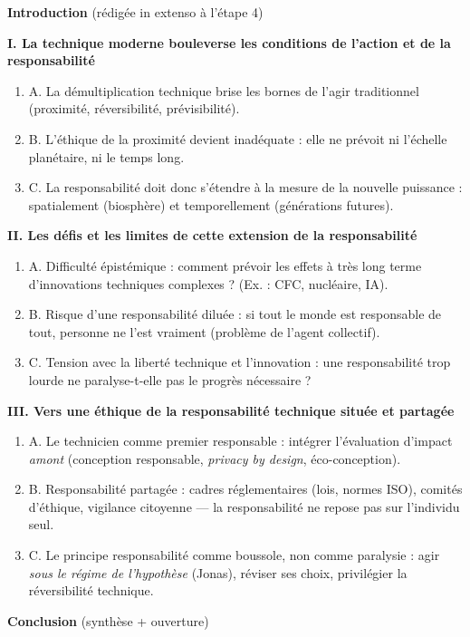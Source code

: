 \documentclass[11pt]{article}
\begin{document}
\begin{exoresolu}
\textbf{Introduction} (rédigée in extenso à l'étape 4)

\textbf{I. La technique moderne bouleverse les conditions de l'action et de la responsabilité}
\begin{enumerate}
\item A. La démultiplication technique brise les bornes de l'agir traditionnel (proximité, réversibilité, prévisibilité).
\item B. L'éthique de la proximité devient inadéquate : elle ne prévoit ni l'échelle planétaire, ni le temps long.
\item C. La responsabilité doit donc s'étendre à la mesure de la nouvelle puissance : spatialement (biosphère) et temporellement (générations futures).
\end{enumerate}

\textbf{II. Les défis et les limites de cette extension de la responsabilité}
\begin{enumerate}
\item A. Difficulté épistémique : comment prévoir les effets à très long terme d'innovations techniques complexes ? (Ex. : CFC, nucléaire, IA).
\item B. Risque d'une responsabilité diluée : si tout le monde est responsable de tout, personne ne l'est vraiment (problème de l'agent collectif).
\item C. Tension avec la liberté technique et l'innovation : une responsabilité trop lourde ne paralyse-t-elle pas le progrès nécessaire ?
\end{enumerate}

\textbf{III. Vers une éthique de la responsabilité technique située et partagée}
\begin{enumerate}
\item A. Le technicien comme premier responsable : intégrer l'évaluation d'impact \emph{amont} (conception responsable, \emph{privacy by design}, éco-conception).
\item B. Responsabilité partagée : cadres réglementaires (lois, normes ISO), comités d'éthique, vigilance citoyenne — la responsabilité ne repose pas sur l'individu seul.
\item C. Le principe responsabilité comme boussole, non comme paralysie : agir \emph{sous le régime de l'hypothèse} (Jonas), réviser ses choix, privilégier la réversibilité technique.
\end{enumerate}

\textbf{Conclusion} (synthèse + ouverture)
\end{exoresolu}
\end{document}
